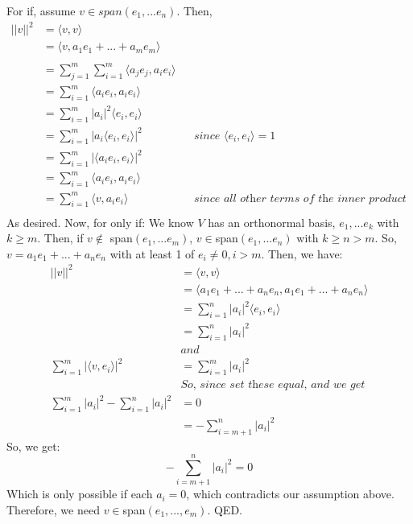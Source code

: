 \documentclass{article}
\begin{document}
For if, assume $v \in span(e_{1},...e_{n})$. Then, 
\begin{align*}
||v||^{2} &= \langle v, v \rangle\\
&= \langle v, a_{1}e_{1} + ... + a_{m}e_{m} \rangle\\\\
&= \sum_{j=1}^{m} \sum_{i=1}^{m} \langle a_{j}e_{j}, a_{i}e_{i} \rangle\\
&= \sum_{i=1}^{m} \langle a_{i}e_{i}, a_{i}e_{i} \rangle\\
&= \sum_{i=1}^{m} |a_{i}|^{2}\langle e_{i}, e_{i} \rangle\\
&= \sum_{i=1}^{m} |a_i \langle e_{i}, e_{i} \rangle|^{2} && \textit{since $\langle e_{i}, e_{i} \rangle = 1$}\\
&= \sum_{i=1}^{m} |\langle a_{i}e_{i},e_{i}\rangle|^{2}\\
&= \sum_{i=1}^{m} \langle a_{i}e_{i}, a_{i}e_{i} \rangle\\
&= \sum_{i=1}^{m} \langle v, a_{i}e_{i} \rangle && \textit{since all other terms of the inner product go to 0}\\
\end{align*}
As desired. Now, for only if:
We know $V$ has an orthonormal basis, $e_{1},...e_{k}$ with $k \geq m$. Then, if $v\notin$ span$(e_{1}, ... e_{m})$, $v\in$span$(e_{1}, ... e_{n})$ with $k \geq n > m$. So, $v = a_{1}e_{1} + ... + a_{n}e_{n}$ with at least 1 of $e_{i} \neq 0, i>m$. Then, we have:
\begin{align*}
||v||^{2} &= \langle v, v\rangle\\
&=\langle a_{1}e_{1} + ... + a_{n}e_{n},  a_{1}e_{1} + ... + a_{n}e_{n} \rangle\\
&=\sum_{i=1}^{n} |a_{i}|^{2} \langle e_{i}, e_{i} \rangle\\
&=\sum_{i=1}^{n} |a_{i}|^{2}\\
&\textit{and}\\
\sum_{i=1}^{m}|\langle v, e_{i} \rangle|^{2} &= \sum_{i=1}^{m}|a_{i}|^{2}\\
&\textit{So, since set these equal, and we get}\\
\sum_{i=1}^{m}|a_{i}|^{2} - \sum_{i=1}^{n} |a_{i}|^{2} &= 0\\
&= -\sum_{i=m+1}^{n}|a_{i}|^{2}
\end{align*}
So, we get: 
\begin{equation*}
-\sum_{i=m+1}^{n}|a_{i}|^{2} = 0
\end{equation*}
Which is only possible if each $a_{i} = 0$, which contradicts our assumption above. Therefore, we need $v\in$span$(e_{1},..., e_{m})$. QED.
\end{document}
